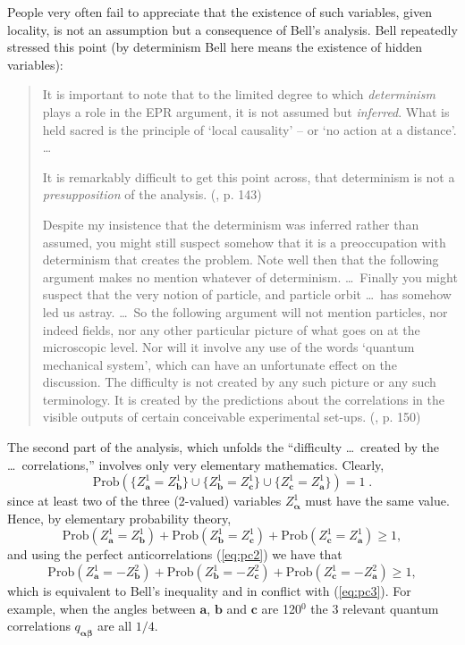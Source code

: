 \documentclass[12pt]{article}
\begin{document}
People very often fail to appreciate that the existence of such
variables, given locality, is not an assumption but a consequence of
Bell's analysis.  Bell repeatedly stressed this point (by determinism
Bell here means the existence of hidden variables):
   \begin{quotation}\setlength{\baselineskip}{12pt}
     It is important to note that to the limited degree to which {\em
       determinism} plays a role in the EPR argument, it is not assumed
     but {\em inferred}. What is held sacred is the principle of `local
     causality' -- or `no action at a distance'.  \ldots

     It is remarkably difficult to get this point across, that
     determinism is not a {\em presupposition} of the analysis.
     (\cite{Bel87}, p. 143)

     Despite my insistence that the determinism was inferred rather
     than assumed, you might still suspect somehow that it is a
     preoccupation with determinism that creates the problem. Note well
     then that the following argument makes no mention whatever of
     determinism.  \ldots\ Finally you might suspect that the very
     notion of particle, and particle orbit \ldots\ has somehow led us
     astray. \ldots\ So the following argument will not mention
     particles, nor indeed fields, nor any other particular picture of
     what goes on at the microscopic level.  Nor will it involve any
     use of the words `quantum mechanical system', which can have an
     unfortunate effect on the discussion.  The difficulty is not
     created by any such picture or any such terminology.  It is
     created by the predictions about the correlations in the visible
     outputs of certain conceivable experimental set-ups.
     (\cite{Bel87}, p. 150)
\end{quotation}

The second part of the analysis, which unfolds the ``difficulty
\ldots\ created by the \ldots\ correlations,'' involves only very
elementary mathematics. Clearly,
$$
\text{Prob}\left( \{Z^{1}_{\mathbf{a}} = Z^{1}_{\mathbf{b}}\} \cup
   \{Z^{1}_{\mathbf{b}} = Z^{1}_{\mathbf{c}}\} \cup
   \{Z^{1}_{\mathbf{c}} = Z^{1}_{\mathbf{a}}\} \right) =1\;.$$
since at
least two of the three (2-valued) variables
$Z^{1}_{\boldsymbol{\alpha}}$ must have the same value. Hence, by
elementary probability theory,
$$
\text{Prob} \left( Z^{1}_{\mathbf{a}} = Z^{1}_{\mathbf{b}}\right) +
\text{Prob} \left( Z^{1}_{\mathbf{b}} = Z^{1}_{\mathbf{c}}\right) +
\text{Prob} \left( Z^{1}_{\mathbf{c}} = Z^{1}_{\mathbf{a}} \right) \ge
1, $$
and using the perfect anticorrelations (\ref{eq:pc2}) we have
that
   \begin{equation}
\text{Prob}
\left( Z^{1}_{\mathbf{a}} =  -Z^{2}_{\mathbf{b}}\right)
+ \text{Prob}
\left( Z^{1}_{\mathbf{b}} = -Z^{2}_{\mathbf{c}}\right)
+ \text{Prob}
\left(  Z^{1}_{\mathbf{c}} =
-Z^{2}_{\mathbf{a}}
     \right) \ge 1, \label{eq:bellineq}
\end{equation}
which is equivalent to Bell's inequality and in conflict with
(\ref{eq:pc3}).  For example, when the angles between $\mathbf{a}$,
$\mathbf{b}$ and $\mathbf{c}$ are 120$^{0}$ the 3 relevant quantum
correlations $q_{ {\boldsymbol{\alpha}} {\boldsymbol{\beta}} }$ are
all $1/4$.
\end{document}
